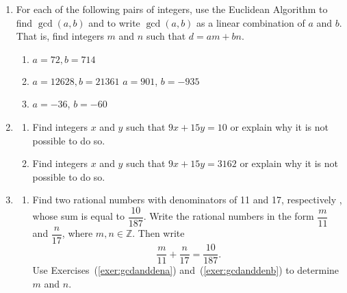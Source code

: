 \begin{enumerate}
\item For each of the following pairs of integers, use the Euclidean Algorithm to find  
$\gcd( {a, b} )$ and to write  $\gcd( {a, b} )$ as a linear combination of  $a$  and  $b$.  That is, find integers  $m$  and  $n$  such that  $d = am + bn$. \label{exer:sec81-4}

\begin{multicols}{2}
\begin{enumerate}
\yitem $a = 36, b = 60$
\yitem $a = 901, b = 935$
\item $a = 72, b = 714$
\item $a = 12628, b = 21361$
\yitem $a = 901$, $b = -935$
\item $a = -36$, $b = -60$
\end{enumerate}
\end{multicols}

\item \label{exer81:solvingeqn} \begin{enumerate}
\yitem Find integers $u$ and $v$ such that $9u + 14v = 1$ or explain why it is not possible to do so.  Then find integers $x$ and $y$ such that $9x + 14y = 10$ or explain why it is not possible to do so.

\item Find integers $x$ and $y$ such that $9x + 15y = 10$ or explain why it is not possible to do so.

\item Find integers $x$ and $y$ such that $9x + 15y = 3162$ or explain why it is not possible to do so.
\end{enumerate}


\item \label{exer:gcdandfractions}
\begin{enumerate} \yitem Notice that  $\gcd( {11, 17} ) = 1$. Find integers  $x$  and  $y$  such that  
\linebreak
$11x + 17y = 1$. \label{exer:gcdanddena}

  \yitem Let  $m, n \in \mathbb{Z}$.  Write the sum  $\dfrac{m}{{11}} + \dfrac{n}{{17}}$
as a single fraction. \label{exer:gcdanddenb}

  \item Find two rational numbers with denominators of  11  and  17, respectively , whose sum is equal to $\dfrac{{10}}{{187}}$.  \hint  Write the rational numbers in the form  
$\dfrac{m}{{11}}$  and  $\dfrac{n}{{17}}$,  where  $m, n \in \mathbb{Z}$.  Then write  
\[
\frac{m}{{11}} + \frac{n}{{17}} = \frac{{10}}{{187}}.
\]
Use Exercises~(\ref{exer:gcdanddena}) and~(\ref{exer:gcdanddenb}) to determine  $m$  and  $n$.


\end{enumerate}
\end{enumerate}
